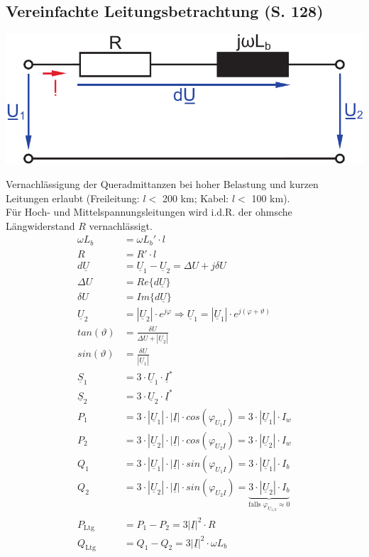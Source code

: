 \documentclass[a4paper,twocolumn,10pt]{article}
\begin{document}
\subsection{Vereinfachte Leitungsbetrachtung (S. 128)}
\begin{center}
\includegraphics[width=0.8\columnwidth]{Grafiken/Uebertragungsleitung}
\end{center}
Vernachlässigung der Queradmittanzen bei hoher Belastung und kurzen Leitungen erlaubt (Freileitung: $l<$ 200 km; Kabel: $l<$ 100 km).\\
Für Hoch- und Mittelspannungsleitungen wird i.d.R. der ohmsche Längwiderstand $R$ vernachlässigt.
\begin{equation*}
\begin{split}
\omega L_b&=\omega L_b'\cdot l\\
R&=R'\cdot l\\
d\underline{U}&=\underline{U}_1-\underline{U}_2=\Delta U+j\delta U\\
\Delta U&=Re\{d\underline{U}\}\\
\delta U&=Im\{d\underline{U}\}\\
\underline{U}_2&=|\underline{U}_2|\cdot e^{j\varphi}\Rightarrow \underline{U}_1=|\underline{U}_1|\cdot e^{j(\varphi+\vartheta)}\\
tan(\vartheta)&=\frac{\delta U}{\Delta U+|\underline{U}_2|}\\
sin(\vartheta)&=\frac{\delta U}{|\underline{U}_1|}\\
\underline{S}_1&=3\cdot\underline{U}_1\cdot\underline{I}^*\\
\underline{S}_2&=3\cdot\underline{U}_2\cdot\underline{I}^*\\
P_1&=3\cdot|\underline{U}_1|\cdot |\underline{I}|\cdot cos(\varphi_{U_1I})=3\cdot |\underline{U}_1|\cdot I_w\\
P_2&=3\cdot|\underline{U}_2|\cdot |\underline{I}|\cdot cos(\varphi_{U_2I})=3\cdot |\underline{U}_2|\cdot I_w\\
Q_1&=3\cdot|\underline{U}_1|\cdot |\underline{I}|\cdot sin(\varphi_{U_1I})=3\cdot |\underline{U}_1|\cdot I_b\\
Q_2&=3\cdot|\underline{U}_2|\cdot |\underline{I}|\cdot sin(\varphi_{U_2I})=\underbrace{3\cdot |\underline{U}_2|\cdot I_b}_{\text{falls } \varphi_{U_{1/2}}\approx 0}\\
P_{\text{Ltg}}&=P_1-P_2=3|\underline{I}|^2\cdot R\\
Q_{\text{Ltg}}&=Q_1-Q_2=3|\underline{I}|^2\cdot \omega L_b
\end{split}
\end{equation*}
\end{document}

